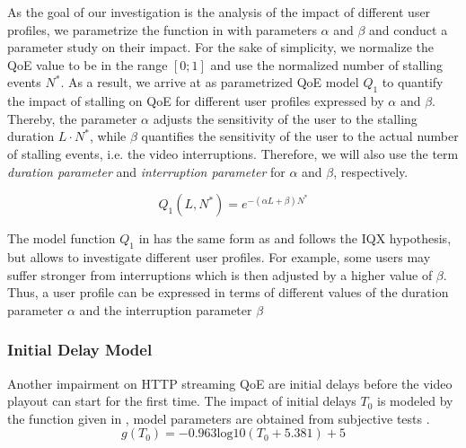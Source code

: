 As the goal of our investigation is the analysis of the impact of different user profiles, we parametrize the function in  with parameters \(\alpha\) and \(\beta\) and conduct a parameter study on their impact. 
For the sake of simplicity, we normalize the QoE value to be in the range \(\left[0;1\right]\)  and use the normalized number of stalling events $N^*$. 
As a result, we arrive at  as parametrized \gls{QoE} model \(Q_1\) to quantify the impact of stalling on QoE for different user profiles expressed by \(\alpha\) and \(\beta\). 
Thereby, the parameter \(\alpha\) adjusts the sensitivity of the user to the stalling duration \(L\cdot N^*\), while \(\beta\) quantifies the sensitivity of the user to the actual number of stalling events, i.e. the video interruptions.
Therefore, we will also use the term \emph{duration parameter} and \emph{interruption parameter} for \(\alpha\) and \(\beta\), respectively.

\begin{equation}
   Q_1(L,N^*) = e^{-\left( \alpha L + \beta\right) N^*} 
\label{eq:application:qoe_user_behaviour:typical_user_scenarios:youtube_qoe:stalling:parameterized_model}
\end{equation}

The model function \(Q_1\) in  has the same form as  and follows the IQX hypothesis, but allows to investigate different user profiles.
For example, some users may suffer stronger from interruptions which is then adjusted by a higher value of \(\beta\).
Thus, a user profile can be expressed in terms of different values of the duration parameter \(\alpha\) and the interruption parameter \(\beta\)

\subsubsection*{Initial Delay  Model}\label{sec:application:qoe_user_behaviour:typical_user_scenarios:initial_delay}
Another impairment on \gls{HTTP} streaming \gls{QoE} are initial delays before the video playout can start for the first time.
The impact of initial delays \(T_0\) is modeled by the function given in , model parameters are obtained from subjective tests \cite{Hossfeld2012c}. 
\begin{equation}
g(T_0)=-0.963 \mathrm{log10}(T_0 + 5.381) + 5
\label{eq:application:qoe_user_behaviour:typical_user_scenarios:initial_delay:original_model}
\end{equation}

